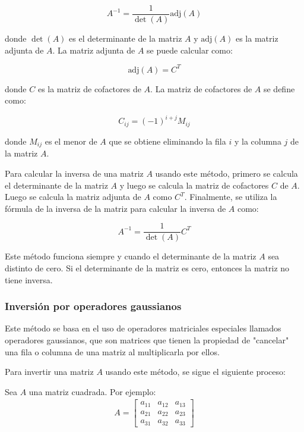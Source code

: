 $$A^{-1} = \frac{1}{\det(A)}\text{adj}(A)$$

donde $\det(A)$ es el determinante de la matriz $A$ y $\text{adj}(A)$ es la matriz adjunta de $A$. La matriz adjunta de $A$ se puede calcular como:

$$\text{adj}(A) = C^T$$

donde $C$ es la matriz de cofactores de $A$. La matriz de cofactores de $A$ se define como:

$$C_{ij} = (-1)^{i+j} M_{ij}$$

donde $M_{ij}$ es el menor de $A$ que se obtiene eliminando la fila $i$ y la columna $j$ de la matriz $A$.

Para calcular la inversa de una matriz $A$ usando este método, primero se calcula el determinante de la matriz $A$ y luego se calcula la matriz de cofactores $C$ de $A$. Luego se calcula la matriz adjunta de $A$ como $C^T$. Finalmente, se utiliza la fórmula de la inversa de la matriz para calcular la inversa de $A$ como:

$$A^{-1} = \frac{1}{\det(A)}C^T$$

Este método funciona siempre y cuando el determinante de la matriz $A$ sea distinto de cero. Si el determinante de la matriz es cero, entonces la matriz no tiene inversa.

\subsubsection*{Inversión por operadores gaussianos}
\label{sec:0_inversion_por_operadores_gaussianos}

Este método se basa en el uso de operadores matriciales especiales llamados operadores gaussianos, que son matrices que tienen la propiedad de "cancelar" una fila o columna de una matriz al multiplicarla por ellos.

Para invertir una matriz $A$ usando este método, se sigue el siguiente proceso:

Sea $A$ una matriz cuadrada. Por ejemplo: \begin{align*}
    A = \left[ \begin{array}{rrr} a_{11} & a_{12} & a_{13} \\ a_{21} & a_{22} & a_{23} \\ a_{31} & a_{32} & a_{33} \end{array} \right]
\end{align*}

